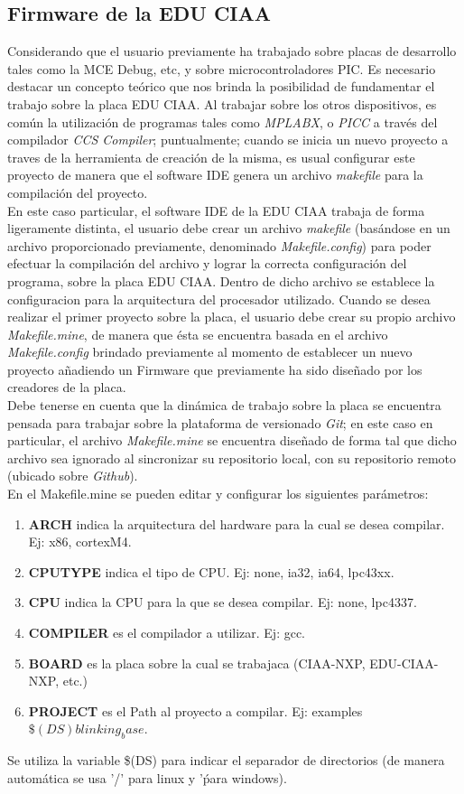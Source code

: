 \documentclass[12pt,letterpaper]{article}
\begin{document}
\subsection{Firmware de la EDU CIAA}
Considerando que el usuario previamente ha trabajado sobre placas de desarrollo tales como la MCE Debug, etc, y sobre microcontroladores PIC. Es necesario destacar un concepto teórico que nos brinda la posibilidad de fundamentar el trabajo sobre la placa EDU CIAA. Al trabajar sobre los otros dispositivos, es común la utilización de programas tales como \textit{MPLABX}, o \textit{PICC} a través del compilador \textit{CCS Compiler}; puntualmente; cuando se inicia un nuevo proyecto a traves de la herramienta de creación de la misma, es usual configurar este proyecto de manera que el software IDE genera un archivo \textit{makefile} para la compilación del proyecto.\\
En este caso particular, el software IDE de la EDU CIAA trabaja de forma ligeramente distinta, el usuario debe crear un archivo \textit{makefile} (basándose en un archivo proporcionado previamente, denominado \textit{Makefile.config}) para poder efectuar la compilación del archivo y lograr la correcta configuración del programa, sobre la placa EDU CIAA. Dentro de dicho archivo se establece la configuracion para la arquitectura del procesador utilizado.
Cuando se desea realizar el primer proyecto sobre la placa, el usuario debe crear su propio archivo \textit{Makefile.mine}, de manera que ésta se encuentra basada en el archivo \textit{Makefile.config} brindado previamente al momento de establecer un nuevo proyecto añadiendo un Firmware que previamente ha sido diseñado por los creadores de la placa.\\
Debe tenerse en cuenta que la dinámica de trabajo sobre la placa se encuentra pensada para trabajar sobre la plataforma de versionado \textit{Git}; en este caso en particular, el archivo \textit{Makefile.mine} se encuentra diseñado de forma tal que dicho archivo sea ignorado al sincronizar su repositorio local, con su repositorio remoto (ubicado sobre \textit{Github}).\\
En el Makefile.mine se pueden editar y configurar los siguientes parámetros:
\begin{enumerate}
\item \textbf{ARCH}  indica la arquitectura del hardware para la cual se desea compilar. Ej: x86, cortexM4.
\item \textbf{CPUTYPE} indica el tipo de CPU. Ej: none, ia32, ia64, lpc43xx.
\item \textbf{CPU} indica la CPU para la que se desea compilar. Ej: none, lpc4337.
\item \textbf{COMPILER }es el compilador a utilizar. Ej: gcc.
\item \textbf{BOARD }es la placa sobre la cual se trabajaca (CIAA-NXP, EDU-CIAA-NXP, etc.)
\item \textbf{PROJECT }es el Path al proyecto a compilar. Ej: examples$\$(DS)blinking_base$.
\end{enumerate}
Se utiliza la variable \$(DS) para indicar el separador de directorios (de manera automática se usa '/' para linux y '\' para windows).\\
\end{document}
